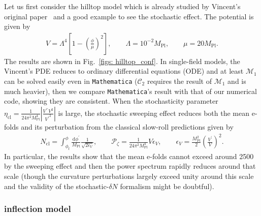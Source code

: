 \documentclass[aps, prd
, preprint
, nofootinbib 
, longbibliography
]{revtex4-1}
\newcommand{\dd}{\mathrm{d}}
\newcommand{\Mpl}{M_\text{Pl}}
\newcommand{\cl}{\text{cl}}
\newcommand{\calC}{\mathcal{C}}
\newcommand{\uf}{\text{f}}
\newcommand{\calM}{\mathcal{M}}
\newcommand{\calP}{\mathcal{P}}
\newcommand{\bae}[1]{\begin{align} #1 \end{align}}
\begin{document}
Let us first consider the hilltop model which is already studied by Vincent's original paper~\cite{Vennin:2015hra} and a good example to see the stochastic effect.
The potential is given by
\bae{\label{eq: hilltop V}
	V=\Lambda^4\left[1-\left(\frac{\phi}{\mu}\right)^2\right], \qquad \Lambda=10^{-2}\Mpl, \qquad \mu=20\Mpl.
}
The results are shown in Fig.~\ref{figs: hilltop_conf}. In single-field models, the Vincent's PDE reduces to ordinary differential equations (ODE) and at least $\calM_1$ can be solved 
easily even in \texttt{Mathematica} ($\calC_2$ requires the result of $\calM_1$ and is much heavier), then we compare \texttt{Mathematica}'s result with that of our numerical code,
showing they are consistent. 
When the stochasticity parameter $\eta_\cl=\frac{1}{24\pi^2\Mpl^4}\left|\frac{V^{\prime\prime}V^2}{{V^\prime}^2}\right|$ is large, 
the stochastic sweeping effect reduces both the mean e-folds and its perturbation from the classical slow-roll predictions given by
\bae{
	N_\cl=\int^\phi_{\phi_\uf}\frac{\dd\phi^\prime}{\Mpl}\frac{1}{\sqrt{2\epsilon_V}}, \qquad \calP_\zeta=\frac{1}{24\pi^2\Mpl^4}{V}{\epsilon_V}, 
	\qquad \epsilon_V=\frac{\Mpl^2}{2}\left(\frac{V^\prime}{V}\right)^2.
}
In particular, the results show that the mean e-folds cannot exceed around 2500 by the sweeping effect and then the power spectrum rapidly reduces around that scale 
(though the curvature perturbations largely exceed unity around this scale and the validity of the stochastic-$\delta N$ formalism might be doubtful).





\subsubsection{inflection model}
\end{document}
